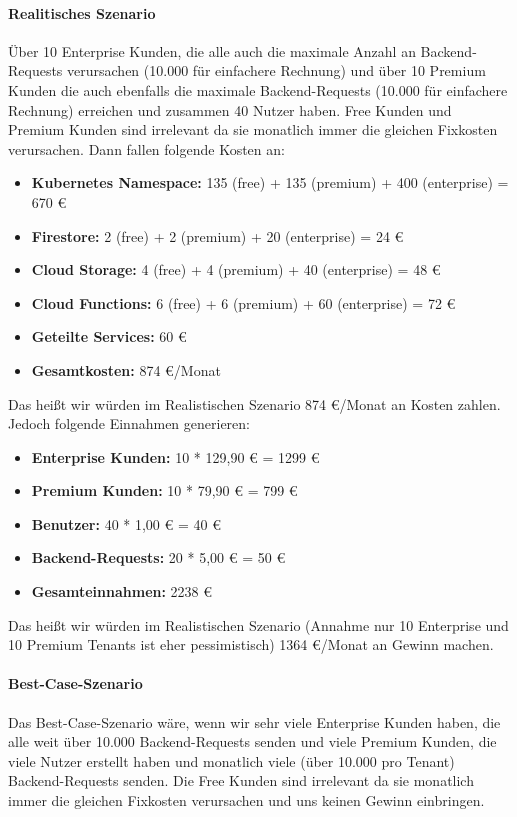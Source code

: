 \paragraph{Realitisches Szenario}
Über 10 Enterprise Kunden, die alle auch die maximale Anzahl an Backend-Requests verursachen (10.000 für einfachere Rechnung) und über 10 Premium Kunden die auch ebenfalls die maximale Backend-Requests (10.000 für einfachere Rechnung) erreichen und zusammen 40 Nutzer haben.
Free Kunden und Premium Kunden sind irrelevant da sie monatlich immer die gleichen Fixkosten verursachen.
Dann fallen folgende Kosten an:
\begin{itemize}
	\item \textbf{Kubernetes Namespace:} 135 (free) + 135 (premium) + 400 (enterprise) = 670 €
	\item \textbf{Firestore:} 2 (free) + 2 (premium) + 20 (enterprise) = 24 €
	\item \textbf{Cloud Storage:} 4 (free) + 4 (premium) + 40 (enterprise) = 48 €
	\item \textbf{Cloud Functions:} 6 (free) + 6 (premium) + 60 (enterprise) = 72 €
	\item \textbf{Geteilte Services:} 60 €
	\item \textbf{Gesamtkosten:} 874 €/Monat
\end{itemize}
Das heißt wir würden im Realistischen Szenario 874 €/Monat an Kosten zahlen.
Jedoch folgende Einnahmen generieren:
\begin{itemize}
	\item \textbf{Enterprise Kunden:} 10 * 129,90 € = 1299 €
	\item \textbf{Premium Kunden:} 10 * 79,90 € = 799 €
	\item \textbf{Benutzer:} 40 * 1,00 € = 40 €
	\item \textbf{Backend-Requests:} 20 * 5,00 € = 50 €
	\item \textbf{Gesamteinnahmen:} 2238 €
\end{itemize}

Das heißt wir würden im Realistischen Szenario (Annahme nur 10 Enterprise und 10 Premium Tenants ist eher pessimistisch) 1364 €/Monat an Gewinn machen.

\paragraph{Best-Case-Szenario}
Das Best-Case-Szenario wäre, wenn wir sehr viele Enterprise Kunden haben, die alle weit über 10.000 Backend-Requests senden und viele Premium Kunden, die viele Nutzer erstellt haben und monatlich viele (über 10.000 pro Tenant) Backend-Requests senden.
Die Free Kunden sind irrelevant da sie monatlich immer die gleichen Fixkosten verursachen und uns keinen Gewinn einbringen.